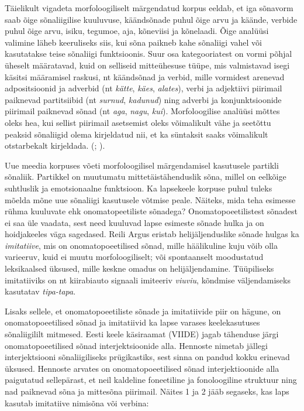 \documentclass[12pt]{article}
\begin{document}
Täielikult vigadeta morfoloogiliselt märgendatud korpus eeldab, et iga sõnavorm saab õige sõnaliigilise kuuluvuse, käändsõnade puhul õige arvu ja käände, verbide puhul õige arvu, isiku, tegumoe, aja, kõneviisi ja kõnelaadi. Õige analüüsi valimine läheb keeruliseks siis, kui sõna paikneb kahe sõnaliigi vahel või kasutatakse teise sõnaliigi funktsioonis. Suur osa kategooriatest on vormi põhjal üheselt määratavad, kuid on selliseid mitteühesuse tüüpe, mis valmistavad isegi käsitsi määramisel raskusi, nt käändsõnad ja verbid, mille vormidest arenevad adpositsioonid ja adverbid (nt \emph{kätte}, \emph{käes}, \emph{alates}), verbi ja adjektiivi piirimail paiknevad partitsiibid (nt \emph{surnud}, \emph{kadunud}) ning adverbi ja konjunktsioonide piirimail paiknevad sõnad (nt \emph{aga}, \emph{nagu}, \emph{kui}). Morfoloogilise analüüsi mõttes oleks hea, kui sellist piirimail asetsemist oleks võimalikult vähe ja seetõttu peaksid sõnaliigid olema kirjeldatud nii, et ka süntaksit saaks võimalikult otstarbekalt kirjeldada. (\citealp[102--104]{Sonaliik}; \citealp[627--631]{Sonaliik2}).

Uue meedia korpuses võeti morfoloogilisel märgendamisel kasutusele partikli sõnaliik. Partikkel on muutumatu mittetäistähenduslik sõna, millel on eelkõige suhtluslik ja emotsionaalne funktsioon. \citep[4]{UUSMEEDIA} Ka lapsekeele korpuse puhul tuleks mõelda mõne uue sõnaliigi kasutusele võtmise peale. Näiteks, mida teha esimesse rühma kuuluvate ehk onomatopeetiliste sõnadega? Onomatopoeetilistest sõnadest ei saa üle vaadata, sest need kuuluvad lapse esimeste sõnade hulka ja on hoidjakeeles väga sagedased. Reili Argus eristab helijäljenduslike sõnade hulgas ka \emph{imitatiive}, mis on onomatopoeetilised sõnad, mille häälikuline kuju võib olla varieeruv, kuid ei muutu morfoloogiliselt; või spontaanselt moodustatud leksikaalsed üksused, mille keskne omadus on helijäljendamine. Tüüpiliseks imitatiiviks on nt kiirabiauto signaali imiteeriv \emph{viuviu}, kõndmise väljendamiseks kasutatav \emph{tipa-tapa}. \citep[19--22]{IMITATIIV}

Lisaks sellele, et onomatopoeetiliste sõnade ja imitatiivide piir on hägune, on onomatopoeetilised sõnad ja imitatiivid ka lapse varases keelekasutuses sõnaliigililt mitmesed. \citep[20--21]{IMITATIIV} Eesti keele käsiraamat (VIIDE) jagab tähenduse järgi onomatopoeetilised sõnad interjektsioonide alla. Hennoste nimetab jällegi interjektsiooni sõnaliigiliseks prügikastiks, sest sinna on pandud kokku erinevad üksused. Hennoste arvates on onomatopoeetilised sõnad interjektioonide alla paigutatud sellepärast, et neil kaldeline foneetiline ja fonoloogiline struktuur ning nad paiknevad sõna ja mittesõna piirimail. \citep[67]{Hennoste} Näites 1 ja 2 jääb segaseks, kas laps kasutab imitatiive nimisõna või verbina:
\end{document}
